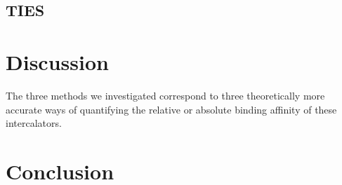 \documentclass{article}
\begin{document}
\subsection{TIES}



\section{Discussion}

The three methods we investigated correspond to three theoretically more accurate ways of quantifying the relative or absolute binding affinity of these intercalators. 

\section{Conclusion}
\end{document}
